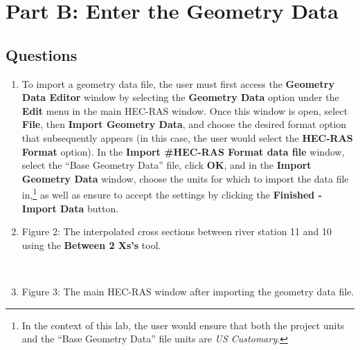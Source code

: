 \documentclass[]{article}
\newcommand\setItemnumber[1]{\setcounter{enumi}{\numexpr#1-1\relax}}
\begin{document}
\section{Part B: Enter the Geometry Data}
\noindent 
\subsection{Questions} \vspace{0.25cm} 
\begin{enumerate}[label=\textbf{\arabic*.}] 
	\setItemnumber{3}
	\item To import a geometry data file, the user must first access the \textbf{Geometry Data Editor} window by selecting the \textbf{Geometry Data} option under the \textbf{Edit} menu in the main HEC-RAS window. Once this window is open, select \textbf{File}, then \textbf{Import Geometry Data}, and choose the desired format option that subsequently appears (in this case, the user would select the \textbf{HEC-RAS Format} option). In the \textbf{Import \#HEC-RAS Format data file} window, select the \enquote{Base Geometry Data} file, click \textbf{OK}, and in the \textbf{Import Geometry Data} window, choose the units for which to import the data file in,\footnote{In the context of this lab, the user would ensure that both the project units and the \enquote{Base Geometry Data} file units are \textit{US Customary}.} as well as ensure to accept the settings by clicking the \textbf{Finished - Import Data} button. \\
	\setItemnumber{4}
	\item \begin{minipage}[t]{\linewidth}
		\raggedright
		
		\medskip
		\begin{center} 
			Figure 2: The interpolated cross sections between river station 11 and 10 using the \textbf{Between 2 Xs's} tool.
		\end{center}
	\end{minipage}
	\setItemnumber{5} \\
	\item \begin{minipage}[t]{\linewidth}
		\raggedright
		
		\medskip
		\begin{center} 
			Figure 3: The main HEC-RAS window after importing the geometry data file.
		\end{center}
	\end{minipage}
\end{enumerate}
\newpage
\end{document}
